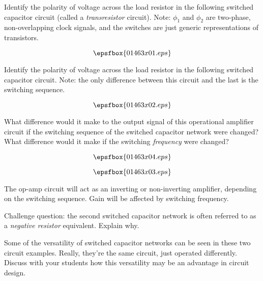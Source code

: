 

Identify the polarity of voltage across the load resistor in the following switched capacitor circuit (called a {\it transresistor} circuit).  Note: $\phi_1$ and $\phi_2$ are two-phase, non-overlapping clock signals, and the switches are just generic representations of transistors.

$$\epsfbox{01463x01.eps}$$

Identify the polarity of voltage across the load resistor in the following switched capacitor circuit.  Note: the only difference between this circuit and the last is the switching sequence.

$$\epsfbox{01463x02.eps}$$

What difference would it make to the output signal of this operational amplifier circuit if the switching sequence of the switched capacitor network were changed?  What difference would it make if the switching {\it frequency} were changed?

$$\epsfbox{01463x04.eps}$$







$$\epsfbox{01463x03.eps}$$

The op-amp circuit will act as an inverting or non-inverting amplifier, depending on the switching sequence.  Gain will be affected by switching frequency.

\vskip 10pt

Challenge question: the second switched capacitor network is often referred to as a {\it negative resistor} equivalent.  Explain why.







Some of the versatility of switched capacitor networks can be seen in these two circuit examples.  Really, they're the same circuit, just operated differently.  Discuss with your students how this versatility may be an advantage in circuit design.




